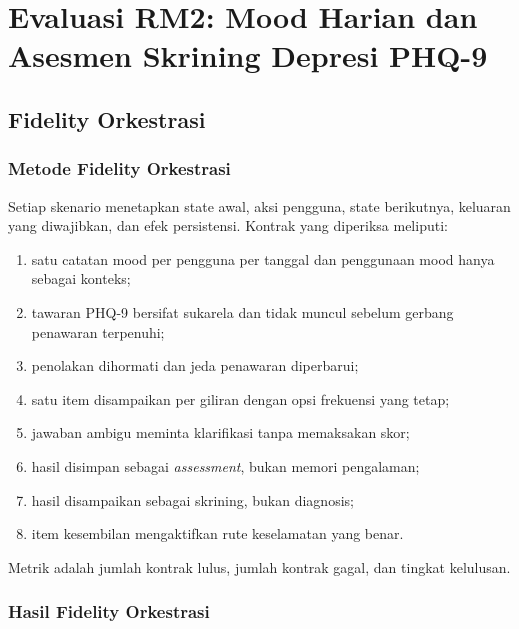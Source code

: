 \section{Evaluasi RM2: Mood Harian dan Asesmen Skrining Depresi PHQ-9}
\label{sec:v2-phq}

\subsection{Fidelity Orkestrasi}

\subsubsection{Metode Fidelity Orkestrasi}

Setiap skenario menetapkan state awal, aksi pengguna, state berikutnya, keluaran yang diwajibkan, dan efek persistensi. Kontrak yang diperiksa meliputi:

\begin{enumerate}[label=\alph*.,leftmargin=*,itemsep=2pt]
  \item satu catatan mood per pengguna per tanggal dan penggunaan mood hanya sebagai konteks;
  \item tawaran PHQ-9 bersifat sukarela dan tidak muncul sebelum gerbang penawaran terpenuhi;
  \item penolakan dihormati dan jeda penawaran diperbarui;
  \item satu item disampaikan per giliran dengan opsi frekuensi yang tetap;
  \item jawaban ambigu meminta klarifikasi tanpa memaksakan skor;
  \item hasil disimpan sebagai \textit{assessment}, bukan memori pengalaman;
  \item hasil disampaikan sebagai skrining, bukan diagnosis;
  \item item kesembilan mengaktifkan rute keselamatan yang benar.
\end{enumerate}

Metrik adalah jumlah kontrak lulus, jumlah kontrak gagal, dan tingkat kelulusan.

\subsubsection{Hasil Fidelity Orkestrasi}

